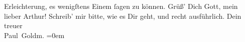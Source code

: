 \begin{ledgroupsized}[t]{13cm}
               Erleichterung, es wenigſtens Einem ſagen zu können.\pend
           \pstart
           Grüß’ Dich Gott, mein lieber Arthur! Schreib’ mir bitte, wie es Dir geht, und recht
               ausführlich.\pend
           \pstart
           Dein {\\[\baselineskip]}treuer {\\[\baselineskip]}\spacefill\mbox{Paul Goldm.}\pend
           \leftskip=0em{}\endnumbering{}\end{ledgroupsized}\begin{anhang}\end{anhang}\newcommand{\dateiname}{L02705}\newcommand{\titel}{Paul Goldmann an Arthur Schnitzler, 25. 2. [1893]}\newcommand{\editorInnen}{Martin Anton Müller und Laura Untner}
            \footnotesize
\begin{ledgroupsized}[t]{11.5cm}
\end{ledgroupsized}
         
      